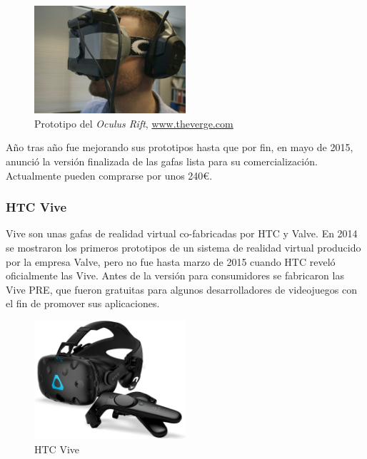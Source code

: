 \begin{figure}[!h]
\begin{center}
    \includegraphics[width=0.5\textwidth]{imagenes/2/oculus-prototipo.jpg}
    \caption{Prototipo del \textit{Oculus Rift}, \url{www.theverge.com}}
    \label{fig:oculus}
\end{center}
\end{figure}

Año tras año fue mejorando sus prototipos hasta que por fin, en mayo de 2015, anunció la versión finalizada de las gafas lista para su comercialización. Actualmente pueden comprarse por unos 240\euro.

\subsubsection{HTC Vive} 

Vive son unas gafas de realidad virtual co-fabricadas por HTC y Valve. En 2014 se mostraron los primeros prototipos de un sistema de realidad virtual producido por la empresa Valve, pero no fue hasta marzo de 2015 cuando HTC reveló oficialmente las Vive. Antes de la versión para consumidores se fabricaron las Vive PRE, que fueron gratuitas para algunos desarrolladores de videojuegos con el fin de promover sus aplicaciones. 

\begin{figure}[!h]
\begin{center}
\includegraphics[width=0.5\textwidth]{imagenes/2/htc-vive.jpg}
\caption{HTC Vive}
\label{fig:htc-vive}
\end{center}
\end{figure}

